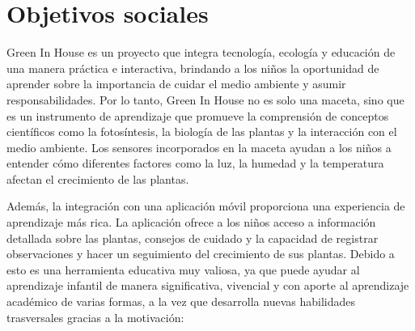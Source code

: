 
\section{Objetivos sociales}\label{objetivos-sociales}

Green In House es un proyecto que integra tecnología, ecología y educación de una manera práctica e interactiva, brindando a los niños la oportunidad de aprender sobre la importancia de cuidar el medio ambiente y asumir responsabilidades. Por lo tanto, Green In House no es solo una maceta, sino que es un instrumento de aprendizaje que promueve la comprensión de conceptos científicos como la fotosíntesis, la biología de las plantas y la interacción con el medio ambiente. Los sensores incorporados en la maceta ayudan a los niños a entender cómo diferentes factores como la luz, la humedad y la temperatura afectan el crecimiento de las plantas.

Además, la integración con una aplicación móvil proporciona una experiencia de aprendizaje más rica. La aplicación ofrece a los niños acceso a información detallada sobre las plantas, consejos de cuidado y la capacidad de registrar observaciones y hacer un seguimiento del crecimiento de sus plantas. Debido a esto es una herramienta educativa muy valiosa, ya que puede ayudar al aprendizaje infantil de manera significativa, vivencial y con aporte al aprendizaje académico de varias formas, a la vez que desarrolla nuevas habilidades trasversales gracias a la motivación:

